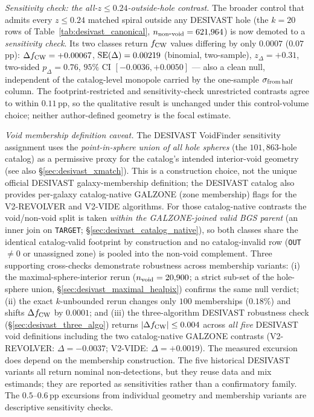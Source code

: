\documentclass[aps,prd,twocolumn,superscriptaddress,showpacs,preprintnumbers,nofootinbib,longbibliography,floatfix]{revtex4-2}
\begin{document}
\emph{Sensitivity check: the all-$z\le0.24$-outside-hole contrast.}
The broader control that admits every $z \le 0.24$ matched spiral
outside any DESIVAST hole (the $k=20$ rows of
Table~\ref{tab:desivast_canonical}, $n_{\rm non\mbox{-}void} =
621{,}964$) is now demoted to a \emph{sensitivity check}. Its two
classes return $f_{\rm CW}$ values differing by only $0.0007$
($0.07$\,pp): $\Delta f_{\rm CW} = +0.00067$, ${\rm SE}(\Delta) =
0.00219$ (binomial, two-sample), $z_\Delta = +0.31$, two-sided
$p_\Delta = 0.76$, $95\%$ CI $[-0.0036, +0.0050]$ --- also a clean null,
independent of the catalog-level monopole carried by the one-sample
$\sigma_{\rm from\,half}$ column. The footprint-restricted and
sensitivity-check unrestricted contrasts agree to within $0.11$\,pp,
so the qualitative result is unchanged under this control-volume
choice; neither author-defined geometry is the focal estimate.

\emph{Void membership definition caveat.}
The DESIVAST VoidFinder sensitivity assignment uses the
\emph{point-in-sphere union of all hole spheres} (the $101{,}863$-hole
catalog) as a permissive proxy for the catalog's intended interior-void
geometry (see also \S\ref{sec:desivast_xmatch}). This is a construction
choice, not the unique official DESIVAST galaxy-membership definition;
the DESIVAST catalog also provides per-galaxy catalog-native GALZONE
(zone membership) flags for the V2-REVOLVER and V2-VIDE algorithms.
For those catalog-native contrasts the void/non-void split is taken
\emph{within the GALZONE-joined valid BGS parent} (an inner join on
\texttt{TARGET}; \S\ref{sec:desivast_catalog_native}), so both classes
share the identical catalog-valid footprint by construction and no
catalog-invalid row (\texttt{OUT}$\neq0$ or unassigned zone) is pooled
into the non-void complement.
Three supporting cross-checks demonstrate robustness across membership
variants: (i) the maximal-sphere-interior rerun ($n_{\rm void} = 20{,}900$;
a strict sub-set of the hole-sphere union, \S\ref{sec:desivast_maximal_healpix})
confirms the same null verdict; (ii) the exact $k$-unbounded rerun
changes only $100$ memberships ($0.18\%$) and shifts $\Delta f_{\rm CW}$
by $0.0001$; and (iii) the three-algorithm DESIVAST robustness check
(\S\ref{sec:desivast_three_algo}) returns $|\Delta f_{\rm CW}| \le 0.004$
across \emph{all five} DESIVAST void definitions including the two
catalog-native GALZONE contrasts (V2-REVOLVER: $\Delta = -0.0037$;
V2-VIDE: $\Delta = +0.0019$). The measured excursion does depend on the
membership construction. The five historical DESIVAST variants all
return nominal non-detections, but they reuse data and mix estimands;
they are reported as sensitivities rather than a confirmatory family.
The $0.5$--$0.6$\,pp excursions from individual geometry and membership
variants are descriptive sensitivity checks.
\end{document}
